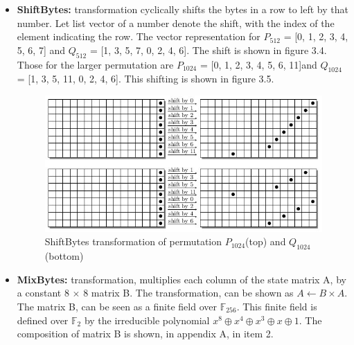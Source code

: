 \begin{itemize}
  \newpage

  \item {\bf ShiftBytes:} transformation cyclically shifts the bytes in a row to left by that number. Let list 
  vector of a number denote the shift, with the index of the element indicating the row. The vector representation
  for $P_{512}$ = [0, 1, 2, 3, 4, 5, 6, 7] and $Q_{512}$ = [1, 3, 5, 7, 0, 2, 4, 6]. The shift is shown in figure
  3.4. Those for the larger permutation are $P_{1024}$ = [0, 1, 2, 3, 4, 5, 6, 11]and $Q_{1024}$ = 
  [1, 3, 5, 11, 0, 2, 4, 6]. This shifting is shown in figure 3.5.
    
  \begin{figure}
    \begin{center}
      \includegraphics[width=6.4in]{groestl1024shift.jpg}
    \end{center}
    \caption{ShiftBytes transformation of permutation $P_{1024}$(top) and $Q_{1024}$(bottom)}
    \label{fig:lab}
  \end{figure}

  \item {\bf MixBytes:} transformation, multiplies each column of the state matrix A, by a constant 8 $\times$ 8 matrix B.
  The transformation, can be shown as $ A \gets B \times A$. The matrix B, can be seen as a finite field over $\mathbb{F}_{256}$.
  This finite field is defined over $\mathbb{F}_{2}$ by the irreducible polynomial $x^{8} \oplus x^{4} \oplus x^{3} \oplus x \oplus 1$.
  The composition of matrix B is shown, in appendix A, in item 2.

  \end{itemize}

